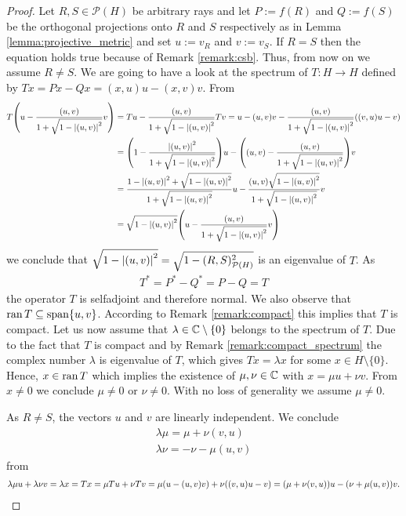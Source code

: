 \begin{proof}
	Let $R,S \in\mathcal{P}(H)$ be arbitrary rays and let $P := f(R)$ and $Q:= f(S)$ be the orthogonal projections onto $R$ and $S$ respectively as in Lemma \ref{lemma:projective_metric} and set $u := v_R$ and $v := v_S$. If $R = S$ then the equation holds true because of Remark \ref{remark:csb}. Thus, from now on we assume $R \neq S$. We are going to have a look at the spectrum of $T: H \to H$ defined by $Tx = Px - Qx = (x,u)u - (x,v)v$. From
	\begin{align*}
	T{\left ( u - \frac{{\left ( u,v \right )}}{1 + \sqrt{1 - {\left | {\left ( u,v \right )} \right |}^2}}v \right )} &= Tu - \frac{{\left ( u,v \right )}}{1 + \sqrt{1 - {\left | {\left ( u,v \right )} \right |}^2}} Tv = u - (u,v)v - \frac{{\left ( u,v \right )}}{1 + \sqrt{1 - {\left | {\left ( u,v \right )} \right |}^2}} {\left ( (v,u) u - v \right )} \\
	&= {\left ( 1 - \frac{{\left | {\left ( u,v \right )} \right |}^2}{1 + \sqrt{1 - {\left | {\left ( u,v \right )} \right |}^2}} \right )}u - {\left ( (u,v) - \frac{{\left ( u,v \right )}}{1 + \sqrt{1 - {\left | {\left ( u,v \right )} \right |}^2}} \right )}v \\
	&= \frac{1 - {\left | {\left ( u,v \right )} \right |}^2 + \sqrt{1 - {\left | {\left ( u,v \right )} \right |}^2}}{1 + \sqrt{1 - {\left | {\left ( u,v \right )} \right |}^2}} u - \frac{(u,v) \sqrt{1 - {\left | {\left ( u,v \right )} \right |}^2}}{1 + \sqrt{1 - {\left | {\left ( u,v \right )} \right |}^2}}v \\
	&= \sqrt{1 - {\left | {\left ( u,v \right )} \right |}^2} {\left ( u - \frac{{\left ( u,v \right )}}{1 + \sqrt{1 - {\left | {\left ( u,v \right )} \right |}^2}}v \right )}
	\end{align*}
	we conclude that $\sqrt{1 - {\left | {\left ( u,v \right )} \right |}^2} = \sqrt{1 - (R,S)_{\mathcal{P}(H)}^2}$ is an eigenvalue of $T$. As
	\begin{align*}
		T^\ast = P^\ast - Q^\ast = P - Q = T
	\end{align*}
	the operator $T$ is selfadjoint and therefore normal. We also observe that $\operatorname{ran} T \subseteq \mathrm{span}\{u, v\}$. According to Remark \ref{remark:compact} this implies that $T$ is compact.  
	Let us now assume that $\lambda \in \mathbb{C} \setminus \{0\}$ belongs to the spectrum of $T$. Due to the fact that $T$ is compact and by Remark \ref{remark:compact_spectrum} the complex number $\lambda$ is eigenvalue of $T$, which gives $T x = \lambda x$ for some $x \in H \setminus \{0\}$. Hence, $x \in \operatorname{ran} T$ which implies the existence of $\mu, \nu \in \mathbb{C}$ with $x = \mu u + \nu v$. From $x \neq 0$ we conclude $\mu \neq 0$ or $\nu \neq 0$. With no loss of generality we assume $\mu \neq 0$.
	
	As $R \neq S$, the vectors $u$ and $v$ are linearly independent. We conclude
	\begin{align}
		\lambda \mu  = \mu  + \nu (v,u) \label{eq:metric1}\\
		 \lambda \nu  = - \nu  - \mu (u,v) \label{eq:metric2}
	\end{align}
	from
	\begin{align*}
		\lambda \mu u + \lambda \nu v = \lambda x = Tx = \mu Tu + \nu Tv = \mu {\left ( u - (u,v)v \right )} + \nu {\left ( (v,u)u - v \right )} = {\left ( \mu + \nu (v,u) \right )} u - {\left ( \nu + \mu(u,v) \right )} v. 
	\end{align*}
	

\end{proof}

